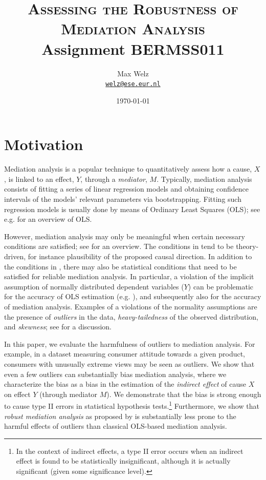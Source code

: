 \documentclass[12pt]{article}
\title{\textsc{Assessing the Robustness of Mediation Analysis} \\[2ex] \Large{Assignment BERMSS011}}
\author{Max Welz \\
  \href{mailto:welz@ese.eur.nl}{\texttt{welz@ese.eur.nl}}}
\date{\today}
\begin{document}
\maketitle
\newpage

\section{Motivation}
Mediation analysis is a popular technique to quantitatively assess how a cause, $X$, is linked to an effect, $Y$, through a \textit{mediator}, $M$. Typically, mediation analysis consists of fitting a series of linear regression models and obtaining confidence intervals of the models' relevant parameters via bootstrapping. Fitting such regression models is usually done by means of Ordinary Least Squares (OLS); see e.g. \cite{wooldridge2015} for an overview of OLS.

However, mediation analysis may only be meaningful when certain necessary conditions are satisfied; see \cite{pieters2017} for an overview. The conditions in \cite{pieters2017} tend to be theory-driven, for instance plausibility of the proposed causal direction. In addition to the conditions in \cite{pieters2017}, there may also be statistical conditions that need to be satisfied for reliable mediation analysis. In particular, a violation of the implicit assumption of normally distributed dependent variables ($Y$) can be problematic for the accuracy of OLS estimation (e.g. \citealp{maronna2019robust}), and subsequently also for the accuracy of mediation analysis. Examples of a violations of the normality assumptions are the presence of \textit{outliers} in the data, \textit{heavy-tailedness} of the observed distribution, and \textit{skewness}; see \cite{alfons2021} for a discussion.

In this paper, we evaluate the harmfulness of outliers to mediation analysis. For example, in a dataset measuring consumer attitude towards a given product, consumers with unusually extreme views may be seen as outliers. We show that even a few outliers can substantially bias mediation analysis, where we characterize the bias as a bias in the estimation of the \textit{indirect effect} of cause $X$ on effect $Y$ (through mediator $M$). We demonstrate that the bias is strong enough to cause type II errors in statistical hypothesis tests.\footnote{In the context of indirect effects, a type II error occurs when an indirect effect is found to be statistically insignificant, although it is actually significant (given some significance level).} Furthermore, we show that \textit{robust mediation analysis} as proposed by \cite{alfons2021} is substantially less prone to the harmful effects of outliers than classical OLS-based mediation analysis. 
\end{document}
